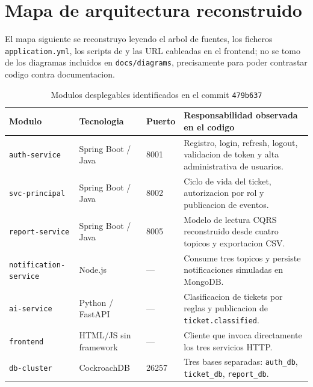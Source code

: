 \documentclass[10pt,a4paper]{article}
\newcommand{\commitCorto}{479b637}
\begin{document}
\section{Mapa de arquitectura reconstruido}

El mapa siguiente se reconstruyo leyendo el arbol de fuentes, los ficheros
\texttt{application.yml}, los scripts de  y las URL cableadas en
el frontend; no se tomo
de los diagramas incluidos en \texttt{docs/diagrams}, precisamente para poder contrastar
codigo contra documentacion.

\begin{table}[h]
\centering
\caption{Modulos desplegables identificados en el commit \texttt{\commitCorto}}
\label{tab:modulos}
\small
\begin{tabularx}{\textwidth}{@{}l l l X@{}}
\toprule
\textbf{Modulo} & \textbf{Tecnologia} & \textbf{Puerto} & \textbf{Responsabilidad observada en el codigo}\\
\midrule
\texttt{auth-service} & Spring Boot / Java & 8001 & Registro, login, refresh, logout, validacion de token y alta administrativa de usuarios.\\
\texttt{svc-principal} & Spring Boot / Java & 8002 & Ciclo de vida del ticket, autorizacion por rol y publicacion de eventos.\\
\texttt{report-service} & Spring Boot / Java & 8005 & Modelo de lectura CQRS reconstruido desde cuatro topicos y exportacion CSV.\\
\texttt{notification-service} & Node.js & --- & Consume tres topicos y persiste notificaciones simuladas en MongoDB.\\
\texttt{ai-service} & Python / FastAPI & --- & Clasificacion de tickets por reglas y publicacion de \texttt{ticket.classified}.\\
\texttt{frontend} & HTML/JS sin framework & --- & Cliente que invoca directamente los tres servicios HTTP.\\
\texttt{db-cluster} & CockroachDB & 26257 & Tres bases separadas: \texttt{auth\_db}, \texttt{ticket\_db}, \texttt{report\_db}.\\
\bottomrule
\end{tabularx}
\end{table}
\end{document}
